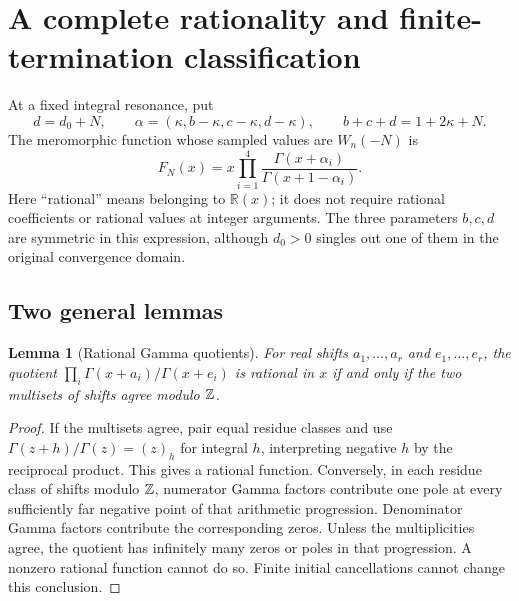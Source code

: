 \documentclass[11pt,a4paper]{article}
\numberwithin{equation}{section}
\newtheorem{lemma}[theorem]{Lemma}
\theoremstyle{definition}\newtheorem{definition}[theorem]{Definition}
\theoremstyle{remark}\newtheorem{remark}[theorem]{Remark}
\begin{document}
\section{A complete rationality and finite-termination classification}
\label{sec:classification}
At a fixed integral resonance, put
\begin{equation}
 d=d_0+N,\qquad
 \alpha=(\kappa,b-\kappa,c-\kappa,d-\kappa),\qquad
 b+c+d=1+2\kappa+N.
 \label{eq:resonance-parameters}
\end{equation}
The meromorphic function whose sampled values are $W_n(-N)$ is
\begin{equation}
 F_N(x)=x\prod_{i=1}^4
                  \frac{\Gamma(x+\alpha_i)}{\Gamma(x+1-\alpha_i)}.
 \label{eq:F}
\end{equation}
Here ``rational'' means belonging to $\mathbb R(x)$; it does not
require rational coefficients or rational values at integer arguments.
The three parameters $b,c,d$ are symmetric in this expression, although
$d_0>0$ singles out one of them in the original convergence domain.

\subsection{Two general lemmas}
\begin{lemma}[Rational Gamma quotients]
\label{lem:gamma-rational}
For real shifts $a_1,\ldots,a_r$ and $e_1,\ldots,e_r$, the quotient
$\prod_i\Gamma(x+a_i)/\Gamma(x+e_i)$ is rational in $x$ if and only
if the two multisets of shifts agree modulo $\mathbb Z$.
\end{lemma}
\begin{proof}
If the multisets agree, pair equal residue classes and use
$\Gamma(z+h)/\Gamma(z)=(z)_h$ for integral $h$, interpreting negative
$h$ by the reciprocal product. This gives a rational function.
Conversely, in each residue class of shifts modulo $\mathbb Z$, numerator
Gamma factors contribute one pole at every sufficiently far negative
point of that arithmetic progression. Denominator Gamma factors
contribute the corresponding zeros. Unless the multiplicities agree,
the quotient has infinitely many zeros or poles in that progression.
A nonzero rational function cannot do so. Finite initial cancellations
cannot change this conclusion.
\end{proof}
\end{document}
